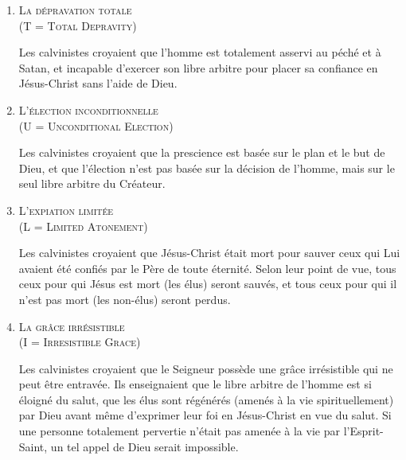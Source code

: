 \begin{enumerate}

  \item  \textsc{La dépravation totale\\\nobreak (\og T \fg{} = Total Depravity)}

\nobreak
Les calvinistes croyaient que l'hom\-me est totalement 
 asservi au péché  et à Satan,
 et incapable d'exercer son libre arbitre 
 pour placer sa confiance en Jésus-Christ sans l'aide de Dieu.

  \item  \textsc{L'élection inconditionnelle\\\nobreak (\og U \fg{} = Unconditional Election)}

\nobreak
Les calvinistes croyaient que la prescience 
 est basée sur le plan et le but de Dieu, et que l'élection
 n'est pas basée sur la décision de l'homme, mais sur le seul \og libre arbitre \fg{}
 du Créateur.

\pocketpagebreak
  \item  \textsc{L'expiation limitée\\\nobreak (\og L \fg{} = Limited Atonement)}

\nobreak
Les calvinistes croyaient que Jésus-Christ était mort pour sauver
 ceux qui Lui avaient été confiés par le Père de toute éternité.
 Selon leur point de vue, tous ceux pour qui Jésus est mort (les élus) seront sauvés,
 et tous ceux pour qui il n'est pas mort (les non-élus) seront perdus.

  \item  \textsc{La grâce irrésistible\\\nobreak (\og I \fg{} = Irresistible Grace)}

\nobreak
\begin{pocketpar}{}
Les calvinistes croyaient que le Seigneur possède une grâce irrésistible
 qui ne peut être entravée. Ils enseignaient que le libre arbitre de l'hom\-me
 est si éloigné du salut, que les élus sont régénérés (amenés à la vie spirituellement)
 par Dieu avant \pocketlinebreak
 même d'exprimer leur foi en Jésus-Christ en vue du salut.
 Si une per\-son\-ne totalement pervertie n'était pas amenée à la vie par l'Esprit-Saint,
 un tel appel de Dieu serait impossible.
\end{pocketpar}


\end{enumerate}
